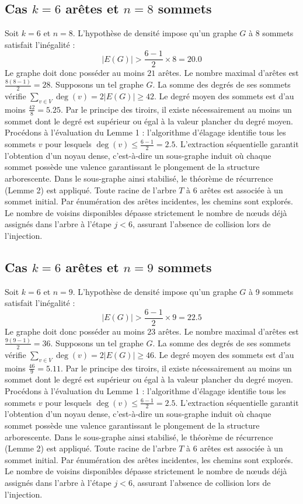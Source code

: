 \documentclass[12pt,a4paper]{article}
\begin{document}
\subsection{Cas $k = 6$ arêtes et $n = 8$ sommets}
Soit $k = 6$ et $n = 8$. L'hypothèse de densité impose qu'un graphe $G$ à 8 sommets satisfait l'inégalité :
$$ |E(G)| > \frac{6-1}{2} \times 8 = 20.0 $$
Le graphe doit donc posséder au moins $21$ arêtes. Le nombre maximal d'arêtes est $\frac{8(8-1)}{2} = 28$.
Supposons un tel graphe $G$. La somme des degrés de ses sommets vérifie $\sum_{v \in V} \deg(v) = 2|E(G)| \geq 42$.
Le degré moyen des sommets est d'au moins $\frac{42}{8} = 5.25$.
Par le principe des tiroirs, il existe nécessairement au moins un sommet dont le degré est supérieur ou égal à la valeur plancher du degré moyen.
Procédons à l'évaluation du Lemme 1 : l'algorithme d'élagage identifie tous les sommets $v$ pour lesquels $\deg(v) \leq \frac{6-1}{2} = 2.5$.
L'extraction séquentielle garantit l'obtention d'un noyau dense, c'est-à-dire un sous-graphe induit où chaque sommet possède une valence garantissant le plongement de la structure arborescente.
Dans le sous-graphe ainsi stabilisé, le théorème de récurrence (Lemme 2) est appliqué. Toute racine de l'arbre $T$ à 6 arêtes est associée à un sommet initial. Par énumération des arêtes incidentes, les chemins sont explorés. Le nombre de voisins disponibles dépasse strictement le nombre de nœuds déjà assignés dans l'arbre à l'étape $j < 6$, assurant l'absence de collision lors de l'injection.

\subsection{Cas $k = 6$ arêtes et $n = 9$ sommets}
Soit $k = 6$ et $n = 9$. L'hypothèse de densité impose qu'un graphe $G$ à 9 sommets satisfait l'inégalité :
$$ |E(G)| > \frac{6-1}{2} \times 9 = 22.5 $$
Le graphe doit donc posséder au moins $23$ arêtes. Le nombre maximal d'arêtes est $\frac{9(9-1)}{2} = 36$.
Supposons un tel graphe $G$. La somme des degrés de ses sommets vérifie $\sum_{v \in V} \deg(v) = 2|E(G)| \geq 46$.
Le degré moyen des sommets est d'au moins $\frac{46}{9} = 5.11$.
Par le principe des tiroirs, il existe nécessairement au moins un sommet dont le degré est supérieur ou égal à la valeur plancher du degré moyen.
Procédons à l'évaluation du Lemme 1 : l'algorithme d'élagage identifie tous les sommets $v$ pour lesquels $\deg(v) \leq \frac{6-1}{2} = 2.5$.
L'extraction séquentielle garantit l'obtention d'un noyau dense, c'est-à-dire un sous-graphe induit où chaque sommet possède une valence garantissant le plongement de la structure arborescente.
Dans le sous-graphe ainsi stabilisé, le théorème de récurrence (Lemme 2) est appliqué. Toute racine de l'arbre $T$ à 6 arêtes est associée à un sommet initial. Par énumération des arêtes incidentes, les chemins sont explorés. Le nombre de voisins disponibles dépasse strictement le nombre de nœuds déjà assignés dans l'arbre à l'étape $j < 6$, assurant l'absence de collision lors de l'injection.
\end{document}
